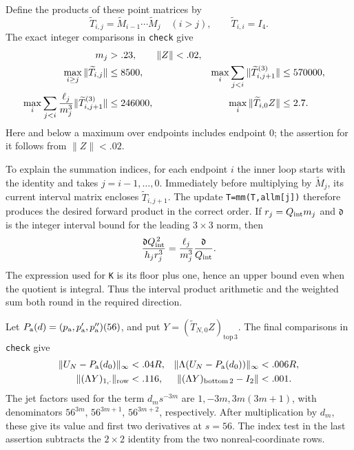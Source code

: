 Define the products of these point matrices by
\[
 \widetilde T_{i,j}=
 \widetilde M_{i-1}\cdots\widetilde M_j\quad (i>j),
 \qquad \widetilde T_{i,i}=I_4.
\]
The exact integer comparisons in \texttt{check} give
\begin{align}
 m_j&>.23,\qquad \|Z\|<.02,\notag\\
 \max_{i\ge j}\|\widetilde T_{i,j}\|&\le8500,
 &\max_i\sum_{j<i}\|\widetilde T_{i,j+1}^{(3)}\|&\le570000,\notag\\
 \max_i\sum_{j<i}\frac{\ell_j}{m_j^3}
                \|\widetilde T_{i,j+1}^{(3)}\|&\le246000,
 &\max_i\|\widetilde T_{i,0}Z\|&\le2.7.
 \label{cert:finite-products}
\end{align}
Here and below a maximum over endpoints includes endpoint \(0\);
the assertion for it follows from \(\|Z\|<.02\).

To explain the summation indices, for each endpoint \(i\) the inner loop
starts with the identity and takes \(j=i-1,\ldots,0\).
Immediately before multiplying by \(\widetilde M_j\), its current interval
matrix encloses \(\widetilde T_{i,j+1}\).
The update \texttt{T=mm(T,allm[j])} therefore produces the desired forward
product in the correct order.  If \(r_j=Q_{\rm int}m_j\) and \(\mathfrak d\)
is the integer interval bound for the leading \(3\times3\) norm, then
\[
 \frac{\mathfrak d Q_{\rm int}^{\,2}}{h_jr_j^3}
 =\frac{\ell_j}{m_j^3}\frac{\mathfrak d}{Q_{\rm int}}.
\]
The expression used for \texttt{K} is its floor plus one, hence an upper
bound even when the quotient is integral.  Thus the interval product
arithmetic and the weighted sum both round in the required direction.

Let \(P_{\rm a}(d)=(p_{\rm a},p'_{\rm a},p''_{\rm a})(56)\), and put
\(Y=(\widetilde T_{N,0}Z)_{\mathrm{top}\,3}\).
The final comparisons in \texttt{check} give
\begin{align}
 \|U_N-P_{\rm a}(d_0)\|_\infty&<.04R,&
 \|\Lambda(U_N-P_{\rm a}(d_0))\|_\infty&<.006R,\notag\\
 \|(\Lambda Y)_{1,\cdot}\|_{\rm row}&<.116,&
 \|(\Lambda Y)_{\mathrm{bottom}\,2}-I_2\|&<.001.
 \label{cert:finite-matching}
\end{align}
The jet factors used for the term \(d_m s^{-3m}\) are
\(1,-3m,3m(3m+1)\), with denominators \(56^{3m}\),
\(56^{3m+1}\), \(56^{3m+2}\), respectively.
After multiplication by \(d_m\), these give its value and first two
derivatives at \(s=56\).
The index test in the last assertion subtracts the \(2\times2\) identity
from the two nonreal-coordinate rows.

